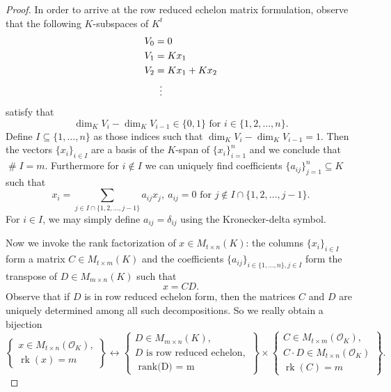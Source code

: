\documentclass{amsart}
\DeclareMathOperator{\card}{\texttt{\#}}
\DeclareMathOperator{\rank}{rk}
\begin{document}
\begin{proof}
\iffalse
In order to arrive at the row reduced echelon matrix formulation, observe that the following $K$-subspaces of $K^{t}$
\begin{align}
V_0 &= 0 \\
V_1 &= K x_1 \\
V_2 & = K x_1 + K x_2 \\
	      & \mathrel{\makebox[\widthof{=}]{\vdots}}
\end{align}
satisfy that 
\begin{equation}
\dim_{K}V_{i} - \dim_{K} V_{i-1}  \in \{0,1\} \text{ for }i \in \{1,2,\dots,n\}.
\end{equation}
Define $I \subseteq \{1,\dots,n\}$ as those indices such that $\dim_K V_i - \dim_K V_{i-1} = 1$. Then the vectors $\{x_i\}_{i \in I}$ are a basis of the $K$-span of $\{x_i\}_{i=1}^{n}$ and 
we conclude that $\card I = m$.
Furthermore for $i \notin I$ we can uniquely find coefficients $\{a_{ij}\}_{j=1}^{n} \subseteq K$
such that
\begin{equation}
x_i = \sum_{j \in I \cap \{1,2,\dots,j-1\}} a_{ij}x_j, \ a_{ij}=0 \text{ for }j \notin I \cap \{1,2,\dots,j-1\}.
\end{equation}
For $i \in I$, we may simply define $a_{ij} = \delta_{ij}$ using the Kronecker-delta symbol. \par
Now we invoke the rank factorization of $x \in M_{t \times n }(K)$: the columns $\{x_i\}_{i \in I}$ form a matrix $C \in M_{t \times m}(K)$ and the coefficients $\{a_{ij}\}_{ i \in \{1,\dots, n\}, j \in I  }$ form the transpose of $D \in M_{m \times n}(K)$ such that 
\begin{equation}
x = C D.
\end{equation}
Observe that if $D$ is in row reduced echelon form,
then the matrices $C$ and $D$ are uniquely determined among all such decompositions. 
So we really obtain a bijection
\begin{equation}
\left\{ \substack{x \in M_{t \times n}(\mathcal{O}_K), \\ \rank(x) = m}  \right\} \leftrightarrow \left\{\substack{ D \in M_{m \times n }(K) ,\\ D \text{ is row reduced echelon},\\ \text{ rank(D) = m}}\right\} \times \left\{\substack{C \in M_{t \times m }(\mathcal{O}_K),\\ C\cdot D \in M_{t \times n}(\mathcal{O}_K) \\ \rank(C) = m}\right\}.
\end{equation}


\end{proof}
\end{document}
